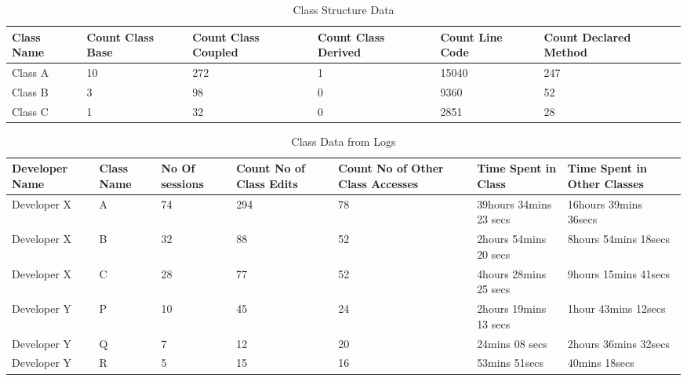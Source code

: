 \begin{center}
\begin{table*}[t]
	\centering
	\caption{Class Structure Data}
	\begin{tabular}{|l|l|l|l|l|l|}
	\hline

Class Name & Count Class Base & Count Class Coupled & Count Class Derived & Count Line Code & Count Declared Method\\
\hline\hline
Class A & 10 & 272 & 1 & 15040 & 247\\
\hline
Class B & 3 & 98 & 0 & 9360 & 52\\
\hline
Class C & 1 & 32 & 0 & 2851 & 28\\
\hline

	\end{tabular}
	\label{fig:ClassStructureAnalysisData}
\end{table*}
\end{center}

\begin{center}
\begin{table*}[t]
	\centering
	\caption{Class Data from Logs}
	\begin{tabular}{|l|l|l|l|l|l|l|}
	\hline

Developer Name & Class Name & No Of sessions &Count No of Class Edits & Count No of Other Class Accesses & Time Spent in Class & Time Spent in Other Classes\\
\hline\hline
Developer X & A & 74 & 294 & 78 & 39hours 34mins 23 secs & 16hours 39mins 36secs\\
\hline
Developer X & B & 32 & 88 & 52 & 2hours 54mins 20 secs & 8hours 54mins 18secs\\
\hline
Developer X & C & 28 & 77 & 52 & 4hours 28mins 25 secs & 9hours 15mins 41secs\\
\hline
Developer Y & P & 10 & 45 & 24 & 2hours 19mins 13 secs & 1hour 43mins 12secs\\
\hline
Developer Y & Q & 7 & 12 & 20 & 24mins 08 secs & 2hours 36mins 32secs\\
\hline
Developer Y & R & 5 & 15 & 16 & 53mins 51secs & 40mins 18secs\\
\hline

	\end{tabular}
	\label{fig:ClassAnalysisData}
\end{table*}
\end{center}

